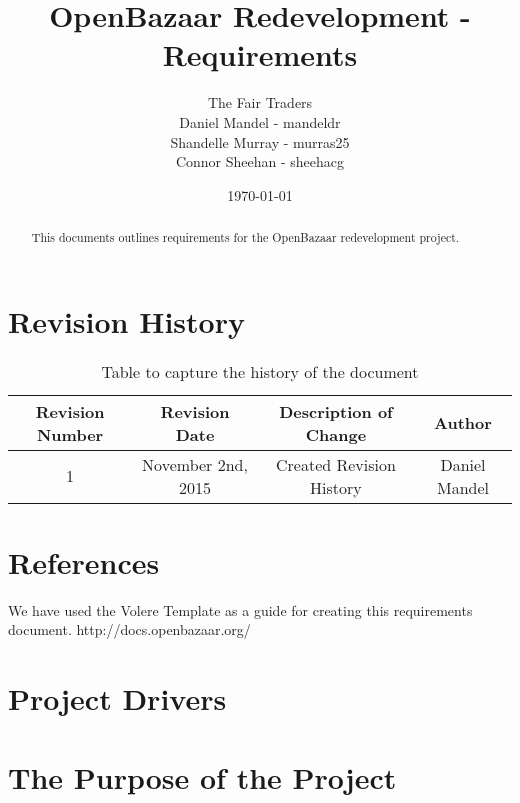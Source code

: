 \documentclass{article}
\begin{document}
\title{OpenBazaar Redevelopment - Requirements}
\author{The Fair Traders \\ Daniel Mandel - mandeldr \\ Shandelle Murray - murras25 \\ Connor Sheehan - sheehacg}
\date{\today}
\maketitle

\begin{abstract}
This documents outlines requirements for the OpenBazaar redevelopment project.
\end{abstract}

\newpage

\tableofcontents

\section*{Revision History}

\begin{table}[h!]
\centering
\begin{tabular}{||c c c c||} 
 \hline
 Revision Number & Revision Date & Description of Change & Author \\ [0.5ex] 
 \hline\hline
 1 & November 2nd, 2015 & Created Revision History & Daniel Mandel \\ [1ex] 
 \hline
\end{tabular}
\caption{Table to capture the history of the document}
\label{table:1}
\end{table}

\section*{References}
We have used the Volere Template as a guide for creating this requirements document.
http://docs.openbazaar.org/

\section*{Project Drivers}

\section{The Purpose of the Project}
\end{document}
